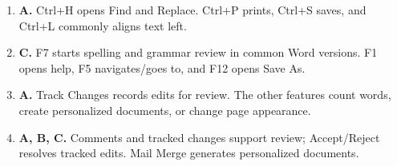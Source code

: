 \begin{enumerate}[label=\textbf{Q\arabic*.}, leftmargin=*]
\item \textbf{A.} Ctrl+H opens Find and Replace. Ctrl+P prints, Ctrl+S saves, and Ctrl+L commonly aligns text left.

\item \textbf{C.} F7 starts spelling and grammar review in common Word versions. F1 opens help, F5 navigates/goes to, and F12 opens Save As.

\item \textbf{A.} Track Changes records edits for review. The other features count words, create personalized documents, or change page appearance.

\item \textbf{A, B, C.} Comments and tracked changes support review; Accept/Reject resolves tracked edits. Mail Merge generates personalized documents.

\end{enumerate}
